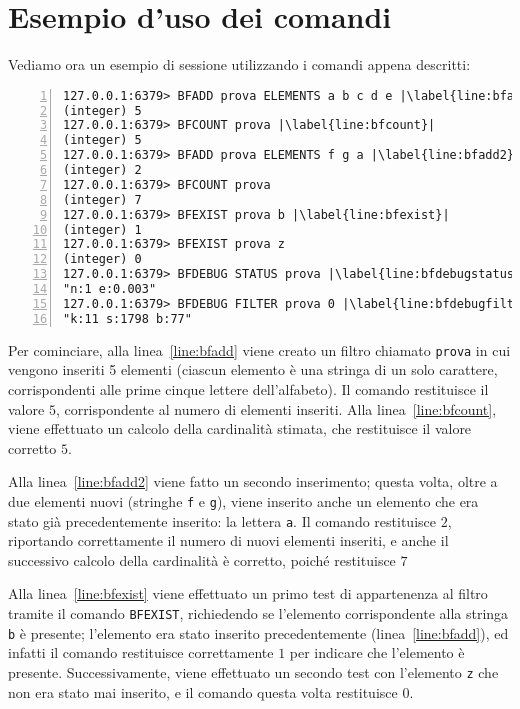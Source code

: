 \section{Esempio d'uso dei comandi}

Vediamo ora un esempio di sessione utilizzando i comandi appena descritti:

\medskip
\begin{lstlisting}[numbers=left,frame=single,caption=Esempio di utilizzo dei nuovi comandi per i filtri di Bloom]
127.0.0.1:6379> BFADD prova ELEMENTS a b c d e |\label{line:bfadd}|
(integer) 5
127.0.0.1:6379> BFCOUNT prova |\label{line:bfcount}|
(integer) 5
127.0.0.1:6379> BFADD prova ELEMENTS f g a |\label{line:bfadd2}|
(integer) 2
127.0.0.1:6379> BFCOUNT prova
(integer) 7
127.0.0.1:6379> BFEXIST prova b |\label{line:bfexist}|
(integer) 1
127.0.0.1:6379> BFEXIST prova z
(integer) 0
127.0.0.1:6379> BFDEBUG STATUS prova |\label{line:bfdebugstatus}|
"n:1 e:0.003"
127.0.0.1:6379> BFDEBUG FILTER prova 0 |\label{line:bfdebugfilter}|
"k:11 s:1798 b:77"
\end{lstlisting}

Per cominciare, alla linea~\ref{line:bfadd} viene creato un filtro chiamato \verb|prova| in cui
vengono inseriti 5 elementi (ciascun elemento è una stringa di un solo carattere, corrispondenti
alle prime cinque lettere dell'alfabeto). Il comando restituisce il valore $5$, corrispondente al
numero di elementi inseriti. Alla linea~\ref{line:bfcount}, viene effettuato un calcolo della 
cardinalità stimata, che restituisce il valore corretto $5$.

Alla linea~\ref{line:bfadd2} viene fatto un secondo inserimento; questa volta, oltre a due
elementi nuovi (stringhe \verb|f| e \verb|g|), viene inserito anche un elemento che era stato
già precedentemente inserito: la lettera \verb|a|. Il comando restituisce $2$, riportando
correttamente il numero di nuovi elementi inseriti, e anche il successivo calcolo della
cardinalità è corretto, poiché restituisce $7$

Alla linea~\ref{line:bfexist} viene effettuato un primo test di appartenenza al filtro tramite
il comando \verb|BFEXIST|, richiedendo
se l'elemento corrispondente alla stringa \verb|b| è presente; l'elemento era stato inserito
precedentemente (linea~\ref{line:bfadd}), ed infatti il comando restituisce correttamente $1$ per
indicare che l'elemento è presente. Successivamente, viene effettuato un secondo test con
l'elemento \verb|z| che non era stato mai inserito, e il comando questa volta restituisce $0$.

